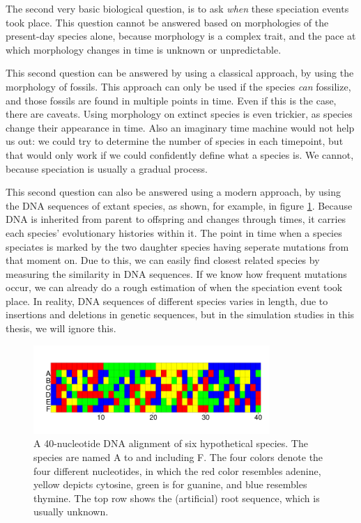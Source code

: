 The second very basic biological question, is to 
ask \emph{when} these speciation events took place.
This question cannot be answered based on morphologies of the present-day
species alone, because morphology is a complex trait, and the pace at
which morphology changes in time is unknown or unpredictable.

This second question can be answered by
using a classical approach, 
by using the morphology of fossils.
This approach can only be used if the species \emph{can} fossilize,
and those fossils are found in multiple points in time.
Even if this is the case, there are caveats. Using morphology on
extinct species is even trickier, as species change their appearance in time.
Also an imaginary time machine would not help us out:
we could try to determine the number of species in each timepoint,
but that would only work if we could confidently define what a
species is. We cannot, because speciation is usually a gradual process.

This second question can also be answered 
using a modern approach, 
by using the DNA sequences of extant species,
as shown, for example, in figure \ref{fig:alignment}.
Because DNA is inherited from parent to offspring
and changes through times, it carries each species' 
evolutionary histories within it.
The point in time when a species speciates is
marked by the two daughter species having seperate mutations
from that moment on.
Due to this, we can easily find closest related species 
by measuring the similarity in DNA sequences.
If we know how frequent mutations occur, we can already
do a rough estimation of when the speciation event took place.
In reality, DNA sequences of different species 
varies in length, due to insertions and deletions in genetic sequences,
but in the simulation studies in this thesis, we will ignore this.

\begin{figure}[H]
  \includegraphics[width=0.8\textwidth]{alignment_40_with_root.png}
  \caption{
    A 40-nucleotide DNA alignment of six hypothetical species. The species
    are named A to and including F. 
    The four colors denote the four different nucleotides,
    in which the red color resembles adenine, yellow depicts cytosine, 
    green is for guanine, and blue resembles thymine. The top
    row shows the (artificial) root sequence, which is usually unknown.
  }
  \label{fig:alignment}
\end{figure}

